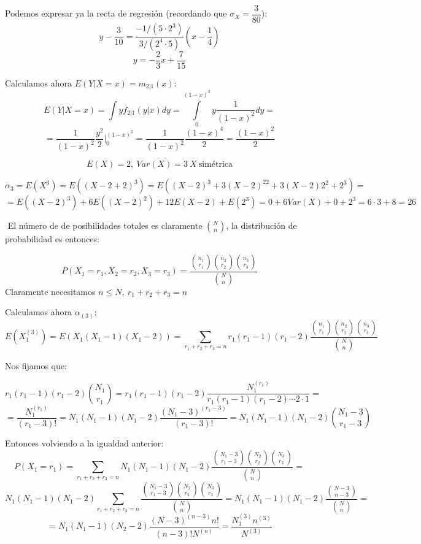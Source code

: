\documentclass[openany]{book}
\begin{document}
\begin{exercise}
    Podemos expresar ya la recta de regresión (recordando que $ \sigma_{X}  = \dfrac{3}{80}$):
    $$ y-\dfrac{3}{10} = \dfrac{-1/(5\cdot 2^3)}{3/(2^{4}\cdot 5)}(x-\dfrac{1}{4}) $$
    $$ y = -\dfrac{2}{3}x+\dfrac{7}{15} $$

    Calculamos ahora $ E(Y|X=x) = m_{2|1}(x) $:
    $$ E(Y|X=x) = \int\limits_{}^{}y f_{2|1}(y|x)dy = \int\limits_{0}^{(1-x)^2}y \dfrac{1}{(1-x)^2}dy = $$
    $$ =\dfrac{1}{(1-x)^2} \dfrac{y^2}{2} \Biggr|_{0}^{(1-x)^2} = \dfrac{1}{(1-x)^2} \dfrac{(1-x)^{4}}{2} = \dfrac{(1-x)^2}{2} $$


\end{exercise}


\begin{exercise}
    $$ E(X) = 2,\ Var(X) = 3\ X\ \text{simétrica} $$
    
    $$ \alpha_{3} = E(X^3) = E((X-2+2)^3) = E((X-2)^3+3(X-2)^22+3(X-2)2^2+2^3) = $$
    $$= E((X-2)^3)+6E((X-2)^2) +12 E(X-2)+E(2^3) = 0 + 6 Var(X)+0+2^3 = 6\cdot 3+8 = 26$$
\end{exercise}


\begin{exercise}
    $  $
    El número de de posibilidades totales es claramente $ \binom{N}{n} $, la distribución de probabilidad es entonces:

    $$ P(X_1=r_1,X_2=r_2,X_3=r_3) = \dfrac{\binom{n_1}{r_1}\binom{n_2}{r_2}\binom{n_3}{r_3}}{\binom{N}{n}} $$
    Claramente necesitamos $ n\leq N,\ r_1+r_2+r_3=n $

    Calculamos ahora $ \alpha_{(3)} $:
    $$ E(X_1 ^{(3)}) = E(X_1(X_1-1)(X_1-2)) = \sum\limits_{r_1+r_2+r_3=n}^{}r_1(r_1-1)(r_1-2)\dfrac{\binom{n_1}{r_1}\binom{n_2}{r_2}\binom{n_3}{r_3}}{\binom{N}{n}} $$

    Nos fijamos que:

    $$r_1(r_1-1)(r_1-2)  \binom{N_1}{r_1} = r_1(r_1-1)(r_1-2) \dfrac{N_1 ^{(r_1)}}{r_1(r_1-1)(r_1-2)\cdots 2\cdot 1} = $$
    $$ =\dfrac{N_1 ^{(r_1)}}{(r_1-3)!} = N_1(N_1-1)(N_1-2) \dfrac{(N_1-3) ^{(r_1-3)}}{(r_1-3)!}  = N_1(N_1-1)(N_1-2)\binom{N_1-3}{r_1-3}$$

    Entonces volviendo a la igualdad anterior:
    $$ P(X_1=r_1) = \sum\limits_{r_1+r_2+r_3=n}^{}N_1(N_1-1)(N_1-2) \dfrac{\binom{N_1-3}{r_1-3}\binom{N_2}{r_2}\binom{N_3}{r_3}}{\binom{N}{n}} =  $$
    $$ N_1(N_1-1)(N_1-2)\sum\limits_{r_1+r_2+r_3=n}^{} \dfrac{\binom{N_1-3}{r_1-3}\binom{N_2}{r_2}\binom{N_3}{r_3}}{\binom{N}{n}} = N_1(N_1-1)(N_1-2) \dfrac{\binom{N-3}{n-3}}{\binom{N}{n}} =$$
    $$ = N_1(N_1-1)(N_2-2) \dfrac{(N-3) ^{(n-3)}n!}{(n-3)!N ^{(n)}} = \dfrac{N_1 ^{(3)}n ^{(3)}}{N ^{(3)}} $$
\end{exercise}
\end{document}
